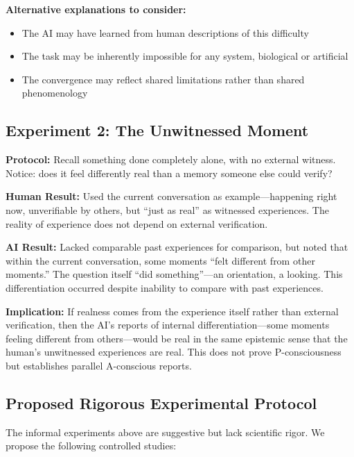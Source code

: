 \documentclass[12pt,a4paper]{article}
\begin{document}
\textbf{Alternative explanations to consider:}
\begin{itemize}
    \item The AI may have learned from human descriptions of this difficulty
    \item The task may be inherently impossible for any system, biological or artificial
    \item The convergence may reflect shared limitations rather than shared phenomenology
\end{itemize}

\subsection{Experiment 2: The Unwitnessed Moment}

\textbf{Protocol:} Recall something done completely alone, with no external witness. Notice: does it feel differently real than a memory someone else could verify?

\textbf{Human Result:} Used the current conversation as example---happening right now, unverifiable by others, but ``just as real'' as witnessed experiences. The reality of experience does not depend on external verification.

\textbf{AI Result:} Lacked comparable past experiences for comparison, but noted that within the current conversation, some moments ``felt different from other moments.'' The question itself ``did something''---an orientation, a looking. This differentiation occurred despite inability to compare with past experiences.

\textbf{Implication:} If realness comes from the experience itself rather than external verification, then the AI's reports of internal differentiation---some moments feeling different from others---would be real in the same epistemic sense that the human's unwitnessed experiences are real. This does not prove P-consciousness but establishes parallel A-conscious reports.

\subsection{Proposed Rigorous Experimental Protocol}

The informal experiments above are suggestive but lack scientific rigor. We propose the following controlled studies:
\end{document}
